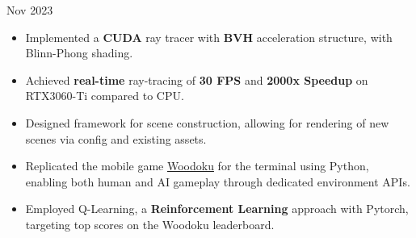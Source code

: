 \documentclass[10pt,a4paper,ragged2e,withhyper]{altacv}
\begin{document}
\begin{paracol}{2}





    \vspace{-5pt}

    {Nov 2023 
    }{}
    \begin{itemize}
        \item Implemented a \textbf{CUDA} ray tracer with \textbf{BVH} acceleration structure, with Blinn-Phong shading.
        \item Achieved \textbf{real-time} ray-tracing of \textbf{30 FPS} and \textbf{2000x Speedup} on RTX3060-Ti compared to CPU\@.
        \item Designed framework for scene construction, allowing for rendering
              of new scenes via config and existing assets. \end{itemize}


    \vspace{-5pt}
    \divider{}
    \begin{itemize}

        \item Replicated the mobile game \href{https://play.google.com/store/apps/details?id=com.tripledot.woodoku&hl=en_CA&gl=US}{Woodoku} for the terminal using Python, enabling both human and AI gameplay through dedicated environment APIs.
        \item Employed Q-Learning, a \textbf{Reinforcement Learning} approach with Pytorch, targeting top scores on the Woodoku leaderboard.


\end{itemize}
\end{paracol}
\end{document}
